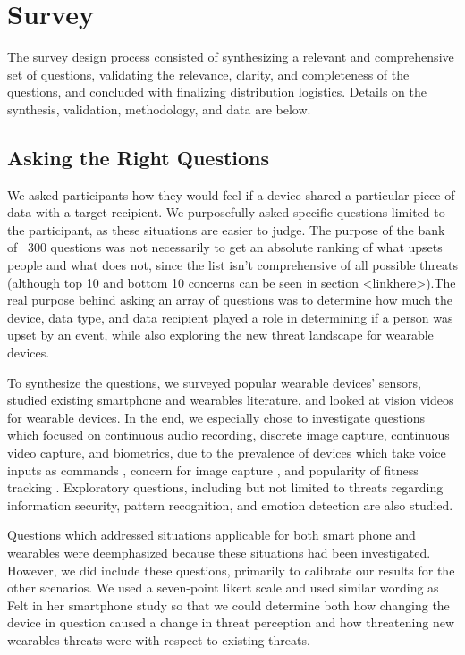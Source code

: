 \documentclass{acm_proc_article-sp}
\begin{document}

\section{Survey}
The survey design process consisted of synthesizing a relevant and comprehensive set of questions, validating the relevance, clarity, and completeness of the questions, and concluded with finalizing distribution logistics. Details on the synthesis, validation, methodology, and data are below.

\subsection{Asking the Right Questions} 
 We asked participants how they would feel if a device shared a particular piece of data with a target recipient. We purposefully asked specific questions limited to the participant, as these situations are easier to judge. The purpose of the bank of ~300 questions was not necessarily to get an absolute ranking of what upsets people and what does not, since the list isn't comprehensive of all possible threats (although top 10 and bottom 10 concerns can be seen in section <linkhere>).The real purpose behind asking an array of questions was to determine how much the device, data type, and data recipient played a role in determining if a person was upset by an event, while also exploring the new threat landscape for wearable devices.

To synthesize the questions, we surveyed popular wearable devices' sensors, studied existing smartphone and wearables literature, and looked at vision videos for wearable devices. In the end, we especially chose  to investigate questions which focused on continuous audio recording, discrete image capture, continuous video capture, and biometrics, due to the prevalence of devices which take voice inputs as commands \cite{StarnerSpeech}, concern for image capture \cite{GlassDetection}, and popularity of fitness tracking \cite{Nilsen}. Exploratory questions, including but not limited to threats regarding information security, pattern recognition, and emotion detection are also studied. 

Questions which addressed situations applicable for both smart phone and wearables were deemphasized because these situations had been investigated. However, we did include these questions, primarily to calibrate our results for the other scenarios. We used a seven-point likert scale and used similar wording as Felt in her smartphone study \cite{Felt} so that we could determine both how changing the device in question caused a change in threat perception and how threatening new wearables threats were with respect to existing threats. 
\end{document}
